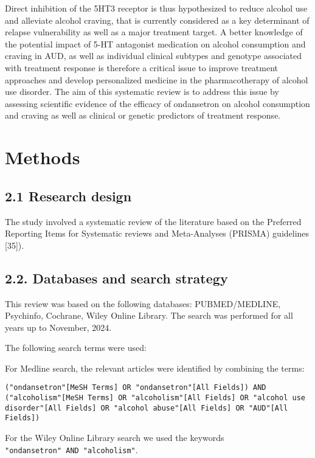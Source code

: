 \documentclass[
  12pt,
]{article}
\begin{document}
Direct inhibition of the 5HT3 receptor is thus hypothesized to reduce
alcohol use and alleviate alcohol craving, that is currently considered
as a key determinant of relapse vulnerability as well as a major
treatment target. A better knowledge of the potential impact of 5-HT
antagonist medication on alcohol consumption and craving in AUD, as well
as individual clinical subtypes and genotype associated with treatment
response is therefore a critical issue to improve treatment approaches
and develop personalized medicine in the pharmacotherapy of alcohol use
disorder. The aim of this systematic review is to address this issue by
assessing scientific evidence of the efficacy of ondansetron on alcohol
consumption and craving as well as clinical or genetic predictors of
treatment response.

\section{Methods}\label{methods}

\subsection{2.1 Research design}\label{research-design}

The study involved a systematic review of the literature based on the
Preferred Reporting Items for Systematic reviews and Meta-Analyses
(PRISMA) guidelines {[}35{]}).

\subsection{2.2. Databases and search
strategy}\label{databases-and-search-strategy}

This review was based on the following databases: PUBMED/MEDLINE,
Psychinfo, Cochrane, Wiley Online Library. The search was performed for
all years up to November, 2024.

The following search terms were used:

For Medline search, the relevant articles were identified by combining
the terms:

\begin{verbatim}
("ondansetron"[MeSH Terms] OR "ondansetron"[All Fields]) AND ("alcoholism"[MeSH Terms] OR "alcoholism"[All Fields] OR "alcohol use disorder"[All Fields] OR "alcohol abuse"[All Fields] OR "AUD"[All Fields])
\end{verbatim}

For the Wiley Online Library search we used the keywords
\texttt{"ondansetron"\ AND\ "alcoholism"}.
\end{document}
